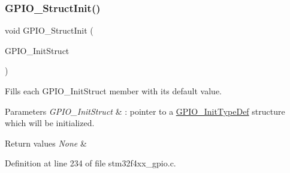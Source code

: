 \subsubsection{\texorpdfstring{G\+P\+I\+O\+\_\+\+Struct\+Init()}{GPIO\_StructInit()}}
{\footnotesize\ttfamily void G\+P\+I\+O\+\_\+\+Struct\+Init (\begin{DoxyParamCaption}\item[{\hyperlink{struct_g_p_i_o___init_type_def}{G\+P\+I\+O\+\_\+\+Init\+Type\+Def} $\ast$}]{G\+P\+I\+O\+\_\+\+Init\+Struct }\end{DoxyParamCaption})}



Fills each G\+P\+I\+O\+\_\+\+Init\+Struct member with its default value. 


\begin{DoxyParams}{Parameters}
{\em G\+P\+I\+O\+\_\+\+Init\+Struct} & \+: pointer to a \hyperlink{struct_g_p_i_o___init_type_def}{G\+P\+I\+O\+\_\+\+Init\+Type\+Def} structure which will be initialized. \\
\hline
\end{DoxyParams}

\begin{DoxyRetVals}{Return values}
{\em None} & \\
\hline
\end{DoxyRetVals}


Definition at line 234 of file stm32f4xx\+\_\+gpio.\+c.

